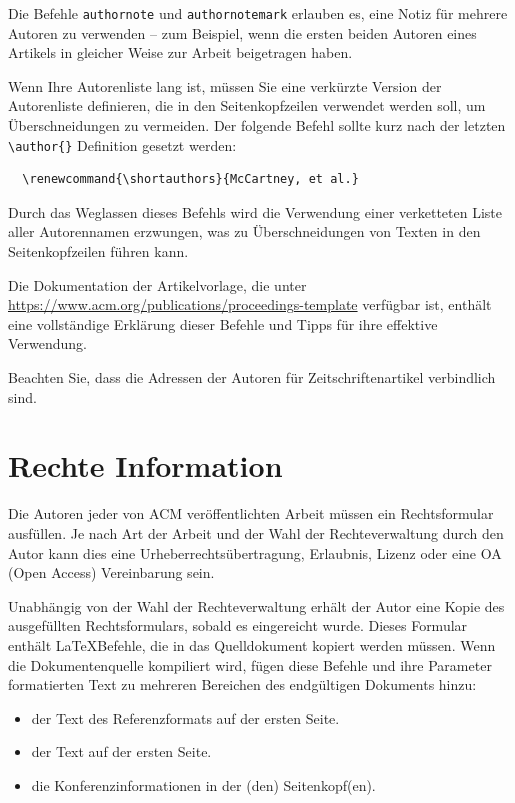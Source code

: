 \documentclass[manuscript,screen,review]{acmart}
\begin{document}
Die Befehle \verb|authornote| und \verb|authornotemark| erlauben es, eine Notiz für mehrere Autoren zu verwenden – zum Beispiel, wenn die ersten beiden Autoren eines Artikels in gleicher Weise zur Arbeit beigetragen haben.

Wenn Ihre Autorenliste lang ist, müssen Sie eine verkürzte Version der Autorenliste definieren, die in den Seitenkopfzeilen verwendet werden soll, um Überschneidungen zu vermeiden. Der folgende Befehl sollte kurz nach der letzten \verb|\author{}| Definition gesetzt werden:
\begin{verbatim}
  \renewcommand{\shortauthors}{McCartney, et al.}
\end{verbatim}
Durch das Weglassen dieses Befehls wird die Verwendung einer verketteten Liste aller Autorennamen erzwungen, was zu Überschneidungen von Texten in den Seitenkopfzeilen führen kann.

Die Dokumentation der Artikelvorlage, die unter \url{https://www.acm.org/publications/proceedings-template} verfügbar ist, enthält eine vollständige Erklärung dieser Befehle und Tipps für ihre effektive Verwendung.

Beachten Sie, dass die Adressen der Autoren für Zeitschriftenartikel verbindlich sind.

\section{Rechte Information}

Die Autoren jeder von ACM veröffentlichten Arbeit müssen ein Rechtsformular ausfüllen. Je nach Art der Arbeit und der Wahl der Rechteverwaltung durch den Autor kann dies eine Urheberrechtsübertragung, Erlaubnis, Lizenz oder eine OA (Open Access) Vereinbarung sein.

Unabhängig von der Wahl der Rechteverwaltung erhält der Autor eine Kopie des ausgefüllten Rechtsformulars, sobald es eingereicht wurde. Dieses Formular enthält \LaTeX Befehle, die in das Quelldokument kopiert werden müssen. Wenn die Dokumentenquelle kompiliert wird, fügen diese Befehle und ihre Parameter formatierten Text zu mehreren Bereichen des endgültigen Dokuments hinzu:
\begin{itemize}
\item der Text des Referenzformats auf der ersten Seite.
\item der Text auf der ersten Seite.
\item die Konferenzinformationen in der (den) Seitenkopf(en).
\end{itemize}
\end{document}
